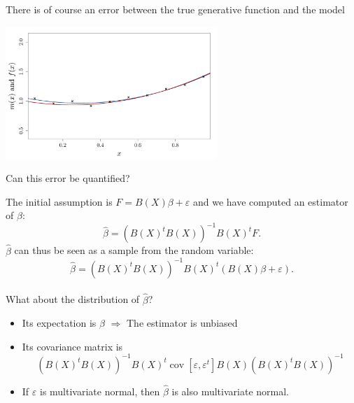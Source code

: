 \documentclass{beamer}
\DeclareMathOperator*{\Cov}{cov}
\begin{document}
\begin{frame}{}
\begin{example}
There is of course an error between the true generative function and the model
\begin{center}
  \includegraphics[height=5cm]{figures/R/linreg_3}
\end{center}
Can this error be quantified?
\end{example}
\end{frame}

\begin{frame}{}
The initial assumption is $ F = B(X) \beta  + \varepsilon$ and we have computed an estimator of $\beta$:
$$\hat{\beta} = (B(X)^t B(X))^{-1} B(X)^t F.$$
$\hat{\beta}$ can thus be seen as a sample from the random variable:
$$\hat{\beta} = (B(X)^t B(X))^{-1} B(X)^t (B(X) \beta  + \varepsilon).$$ \\
\vspace{5mm}
What about the distribution of $\hat{\beta}$? \pause
\begin{itemize}
	\item Its expectation is $\beta$ \alert{$\Rightarrow$} The estimator is unbiased
	\item Its covariance matrix is $$(B(X)^t B(X))^{-1} B(X)^t \Cov[\varepsilon,\varepsilon^t] B(X) (B(X)^t B(X))^{-1}$$
	\item If $\varepsilon$ is multivariate normal, then $\hat{\beta}$ is also multivariate normal.
\end{itemize}
\end{frame}
\end{document}
